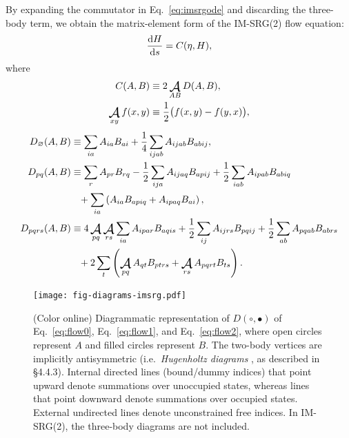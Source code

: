 By expanding the commutator in Eq.\ \eqref{eq:imsrgode} and discarding the three-body term, we obtain the matrix-element form of the IM-SRG(2) flow equation:
\begin{align}
    \frac{\operatorname{d\!} H}{\operatorname{d\!} s} = C(\eta, H), \label{eq:flowmxe}
\end{align}
where
\begin{align}
  C(A, B) &\equiv 2 \antisymm_{A B} D(A, B), \label{eq:commutmxe} \\
  \antisymm_{x y} f(x, y) &\equiv \frac{1}{2} \bigl(f(x, y) - f(y, x)\bigr),
\end{align}
\begin{align}
  D_\varnothing(A, B)
  &\equiv
    \sum_{i a} A_{i a} B_{a i}
    + \frac{1}{4} \sum_{i j a b} A_{i j a b} B_{a b i j},
    \label{eq:flow0} \\
  D_{p q}(A, B)
  &\equiv
    \sum_r A_{p r} B_{r q}
    - \frac{1}{2} \sum_{i j a} A_{i j a q} B_{a p i j}
    + \frac{1}{2} \sum_{i a b} A_{i p a b} B_{a b i q}
    \notag \\
  &\hphantom{=}
    + \sum_{i a} \left(
    A_{i a} B_{a p i q}
    + A_{i p a q} B_{a i}
    \right),
    \label{eq:flow1} \\
  D_{p q r s}(A, B)
  &\equiv
    4 \antisymm_{p q} \antisymm_{r s} \sum_{i a} A_{i p a r} B_{a q i s}
    + \frac{1}{2} \sum_{i j} A_{i j r s} B_{p q i j}
    + \frac{1}{2} \sum_{a b} A_{p q a b} B_{a b r s}
    \notag \\
  &\hphantom{=}
    + 2 \sum_t \left(
    \antisymm_{p q} A_{q t} B_{p t r s}
    + \antisymm_{r s} A_{p q r t} B_{t s}
    \right).
    \label{eq:flow2}
\end{align}

\begin{figure}
\texttt{[image: fig-diagrams-imsrg.pdf]}
\caption{(Color online) Diagrammatic representation of $D(\circ, \bullet)$ of Eq.\ \eqref{eq:flow0}, Eq.\ \eqref{eq:flow1}, and Eq.\ \eqref{eq:flow2}, where open circles represent $A$ and filled circles represent $B$.  The two-body vertices are implicitly antisymmetric (i.e.\ \textit{Hugenholtz diagrams} \cite{HUGENHOLTZ1957481}, as described in \cite{shavitt2009many} \S 4.4.3).  Internal directed lines (bound/dummy indices) that point upward denote summations over unoccupied states, whereas lines that point downward denote summations over occupied states.  External undirected lines denote unconstrained free indices.  In IM-SRG(2), the three-body diagrams are not included.}
\label{fig:diagrams-imsrg}
\end{figure}

